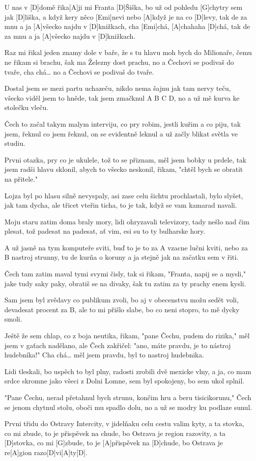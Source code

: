 
\sloka
U nas v [D]domě řika[A]ji mi Franta [D]Šiška,
bo už od pohledu [G]chytry sem jak [D]liška,
a když kery něco [Emi]nevi nebo [A]když je na co [D]levy,
tak de za mnu a ja [A]všecko najdu v [D]knižkach,
cha [Emi]chá, [A]chahaha [D]chá, tak de za mnu a ja [A]všecko najdu v [D]knižkach.

\sloka
Raz mi řikal jeden znamy dole v baře,
že s tu hlavu moh bych do Milionaře,
čemu ne řikam si brachu, šak ma Železny dost prachu,
no a Čechovi se podivaš do tvaře,
cha chá… no a Čechovi se podivaš do tvaře.

\sloka
Dostal jsem se mezi partu uchazeču,
nikdo nema šajnu jak tam nervy teču,
všecko viděl jsem to hněde, tak jsem zmačknul A B C D,
no a už mě kurva ke stolečku vleču.

\sloka
Čech to začal takym malym interviju,
co pry robim, jestli kuřim a co piju,
tak jsem, řeknul co jsem řeknul, on se evidentně leknul
a už začly blikat světla ve studiu.

\sloka
Prvni otazka, pry co je ukulele,
tož to se přiznam, měl jsem bobky u prdele,
tak jsem radši hlavu sklonil, abych to všecko neskonil,
řikam, "chtěl bych se obratit na přitele."

\sloka
Lojza byl po hlasu silně nevyspaly,
asi zase celu šichtu prochlastali,
bylo slyšet, jak tam dycha, ale třicet vteřin ticha,
to je tak, když se vam kamarad navali.

\sloka
Moju staru zatim doma braly mory,
lidi ohryzavali televizory,
tady nešlo nad čim plesat, tož padesat na padesat,
ať vim, esi su to ty bulharske hory.

\sloka
A už jasně na tym komputeře sviti,
buď to je to za A vzacne lučni kviti,
nebo za B nastroj strunny, tu de kurňa o koruny
a ja stejně jak na začatku sem v řiti.

\sloka
Čech tam zatim maval tymi svymi čisly,
tak si řikam, "Franta, napij se a mysli,"
jake tudy saky paky, obratiš se na divaky,
šak tu zatim za ty prachy enem kysli.

\sloka
Sam jsem byl zvědavy co publikum zvoli,
bo aj v obecenstvu možu sedět voli,
devadesat procent za B, ale to mi přišlo slabe,
bo co neni stopro, to mě dycky smoli.

\sloka
Ještě že sem chlap, co z boja neutika,
řikam, "pane Čechu, pudem do rizika,"
měl jsem v gaťach nadělano, ale Čech zakřičel: "ano,
máte pravdu, je to nástroj hudebníka!"
Cha chá… měl jsem pravdu, byl to nastroj hudebnika.

\sloka
Lidi tleskali, bo uspěch to byl plny,
radosti zrobili dvě mexicke vlny,
a ja, co mam srdce skromne jako všeci z Dolni Lomne,
sem byl spokojeny, bo sem ukol splnil.

\sloka
"Pane Čechu, nerad přetahnul bych strunu,
končim hru a beru tisicikorunu,"
Čech se jenom chytnul stolu, oboči mu spadlo dolu,
no a už se modry ku podlaze sunul.

\sloka
Prvni třidu do Ostravy Intercity,
v jidelňaku celu cestu valim kyty,
a ta stovka, co mi zbude, to je přispěvek na chude,
bo Ostrava je region razovity,
a ta [D]stovka, co mi [G]zbude, to je [A]přispěvek na [D]chude,
bo Ostrava je re[A]gion razo[D]vi[A]ty[D].
